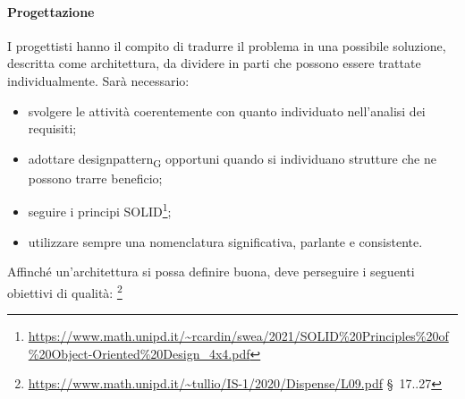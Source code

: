         \paragraph{Progettazione}
                I progettisti hanno il compito di tradurre il problema in una possibile soluzione, descritta come architettura, da dividere in parti che possono essere trattate individualmente. Sarà necessario:
                \begin{itemize}
                    \item svolgere le attività coerentemente con quanto individuato nell'analisi dei requisiti;
                    \item adottare \gls{designpattern}\textsubscript{G} opportuni quando si individuano strutture che ne possono trarre beneficio;
                    \item seguire i principi SOLID\footnote{\url{https://www.math.unipd.it/~rcardin/swea/2021/SOLID\%20Principles\%20of\%20Object-Oriented\%20Design_4x4.pdf}};
                    \item utilizzare sempre una nomenclatura significativa, parlante e consistente.
                \end{itemize}
                Affinché un'architettura si possa definire buona, deve perseguire i seguenti obiettivi di qualità: \footnote{\url{https://www.math.unipd.it/~tullio/IS-1/2020/Dispense/L09.pdf} \S\ 17..27}
